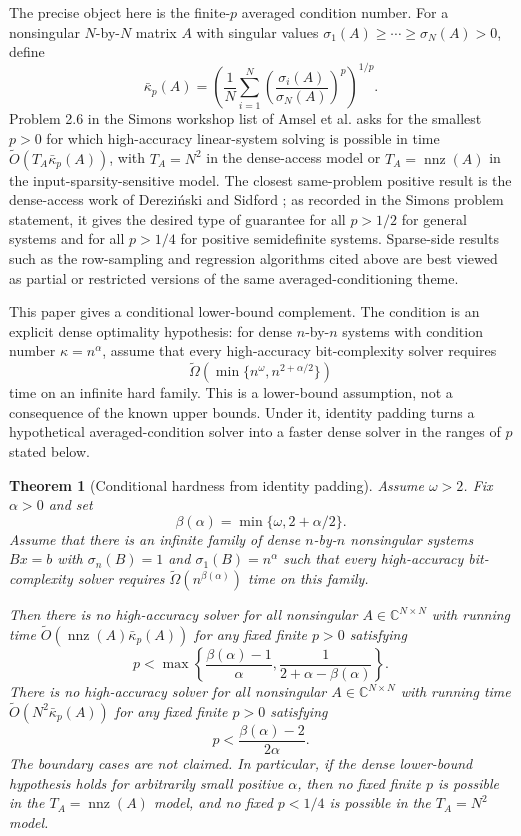 \documentclass[11pt]{article}
\newtheorem{theorem}{Theorem}[section]
\begin{document}
The precise object here is the finite-$p$ averaged condition number.  For a
nonsingular $N$-by-$N$ matrix $A$ with singular values
$\sigma_1(A)\geq\cdots\geq\sigma_N(A)>0$, define
\[
  \bar{\kappa}_p(A)=
  \left(\frac{1}{N}\sum_{i=1}^N
  \left(\frac{\sigma_i(A)}{\sigma_N(A)}\right)^p\right)^{1/p}.
\]
Problem 2.6 in the Simons workshop list of Amsel et al.
\cite{AmselEtAl2026SimonsLinearSystems} asks for the smallest $p>0$ for which
high-accuracy linear-system solving is possible in time
$\widetilde{O}(T_A\bar{\kappa}_p(A))$, with $T_A=N^2$ in the dense-access model
or $T_A=\operatorname{nnz}(A)$ in the input-sparsity-sensitive model.  The
closest same-problem positive result is the dense-access work of
Derezi\'nski and Sidford \cite{DerezinskiSidford2026DenseLowRank}; as recorded
in the Simons problem statement, it gives the desired type of guarantee for
all $p>1/2$ for general systems and for all $p>1/4$ for positive semidefinite
systems.  Sparse-side results such as the row-sampling and regression
algorithms cited above are best viewed as partial or restricted versions of the
same averaged-conditioning theme.

This paper gives a conditional lower-bound complement.  The condition is an
explicit dense optimality hypothesis: for dense $n$-by-$n$ systems with
condition number $\kappa=n^\alpha$, assume that every high-accuracy
bit-complexity solver requires
\[
  \widetilde{\Omega}\left(\min\{n^\omega,n^{2+\alpha/2}\}\right)
\]
time on an infinite hard family.  This is a lower-bound assumption, not a
consequence of the known upper bounds.  Under it, identity padding turns a
hypothetical averaged-condition solver into a faster dense solver in the
ranges of $p$ stated below.

\begin{theorem}[Conditional hardness from identity padding]
\label{thm:main}
Assume $\omega>2$.  Fix $\alpha>0$ and set
\[
  \beta(\alpha)=\min\{\omega,2+\alpha/2\}.
\]
Assume that there is an infinite family of dense $n$-by-$n$ nonsingular
systems $Bx=b$ with $\sigma_n(B)=1$ and $\sigma_1(B)=n^{\alpha}$ such that
every high-accuracy bit-complexity solver requires
$\widetilde{\Omega}(n^{\beta(\alpha)})$ time on this family.

Then there is no high-accuracy solver for all nonsingular $A\in
\mathbb{C}^{N\times N}$ with running time
$\widetilde{O}(\operatorname{nnz}(A)\bar{\kappa}_p(A))$ for any fixed finite
$p>0$ satisfying
\[
  p<
  \max\left\{
    \frac{\beta(\alpha)-1}{\alpha},
    \frac{1}{2+\alpha-\beta(\alpha)}
  \right\}.
\]
There is no high-accuracy solver for all nonsingular
$A\in\mathbb{C}^{N\times N}$ with running time
$\widetilde{O}(N^2\bar{\kappa}_p(A))$ for any fixed finite $p>0$ satisfying
\[
  p<\frac{\beta(\alpha)-2}{2\alpha}.
\]
The boundary cases are not claimed.  In particular, if the dense lower-bound
hypothesis holds for arbitrarily small positive $\alpha$, then no fixed finite
$p$ is possible in the $T_A=\operatorname{nnz}(A)$ model, and no fixed
$p<1/4$ is possible in the $T_A=N^2$ model.
\end{theorem}
\end{document}
